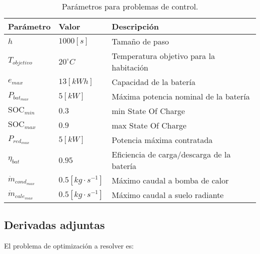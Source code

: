 \begin{table}[ht]
	\centering
	\label{tab:control_data}
	\caption{Parámetros para problemas de control.}
	\begin{tabular}{@{}lll@{}}
		\toprule
		\textbf{Parámetro}     & \textbf{Valor}         & \textbf{Descripción}                       \\
		\midrule
		$h$                    & $1000[s]$              & Tamaño de paso                             \\
		$T_{objetivo}$         & $20 ^\circ C$          & Temperatura objetivo para la habitación    \\
		$e_{max}$              & $13[kWh]$              & Capacidad de la batería                    \\
		$P_{bat_{max}}$        & $5[kW]$                & Máxima potencia nominal de la batería      \\
		$\text{SOC}_{min}$     & $0.3$                  & min State Of Charge                        \\
		$\text{SOC}_{max}$     & $0.9$                  & max State Of Charge                        \\
		$P_{red_{max}}$        & $5[kW]$                & Potencia máxima contratada                 \\
		$\eta_{bat}$           & $0.95$                 & Eficiencia de carga/descarga de la batería \\
		$\dot{m}_{cond_{max}}$ & $0.5[kg \cdot s^{-1}]$ & Máximo caudal a bomba de calor             \\
		$\dot{m}_{cale_{max}}$ & $0.5[kg \cdot s^{-1}]$ & Máximo caudal a suelo radiante             \\
		\bottomrule
	\end{tabular}
\end{table}


\subsection{Derivadas adjuntas}

El problema de optimización a resolver es:

